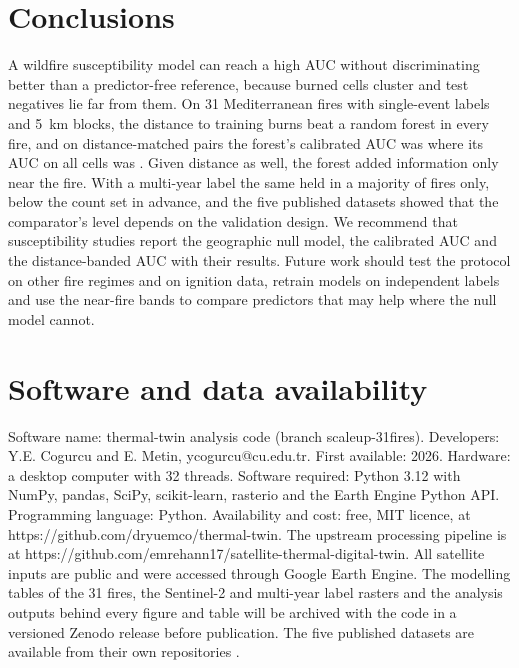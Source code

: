 \documentclass[preprint,12pt,authoryear]{elsarticle}
\begin{document}
\section{Conclusions}
\label{sec:conclusions}

A wildfire susceptibility model can reach a high AUC without discriminating better than a predictor-free reference, because burned cells cluster and test negatives lie far from them. On 31 Mediterranean fires with single-event labels and 5~km blocks, the distance to training burns beat a random forest in every fire, and on distance-matched pairs the forest's calibrated AUC was \vcaucFive{} where its AUC on all cells was \vaucRfFive{}. Given distance as well, the forest added information only near the fire. With a multi-year label the same held in a majority of fires only, below the count set in advance, and the five published datasets showed that the comparator's level depends on the validation design. We recommend that susceptibility studies report the geographic null model, the calibrated AUC and the distance-banded AUC with their results. Future work should test the protocol on other fire regimes and on ignition data, retrain models on independent labels and use the near-fire bands to compare predictors that may help where the null model cannot.

\section*{Software and data availability}

Software name: thermal-twin analysis code (branch scaleup-31fires). Developers: Y.E. Cogurcu and E. Metin, ycogurcu@cu.edu.tr. First available: 2026. Hardware: a desktop computer with 32 threads. Software required: Python 3.12 with NumPy, pandas, SciPy, scikit-learn, rasterio and the Earth Engine Python API. Programming language: Python. Availability and cost: free, MIT licence, at https://github.com/dryuemco/thermal-twin. The upstream processing pipeline is at https://github.com/emrehann17/satellite-thermal-digital-twin. All satellite inputs are public and were accessed through Google Earth Engine. The modelling tables of the 31 fires, the Sentinel-2 and multi-year label rasters and the analysis outputs behind every figure and table will be archived with the code in a versioned Zenodo release before publication. The five published datasets are available from their own repositories \citep{Heo2026data,Alberta2026data,Khan2026data,Cilli2023data,Mesogeos2025data}.
\end{document}
